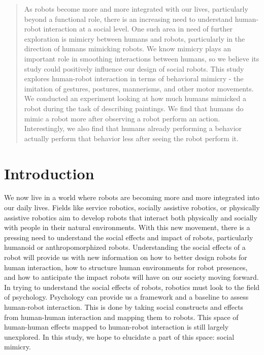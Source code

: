 \documentclass{acm_proc_article-sp}
\begin{document}
\maketitle
\begin{abstract}
As robots become more and more integrated with our lives, particularly beyond a functional role, there is an increasing need to understand human-robot interaction at a social level. One such area in need of further exploration is mimicry between humans and robots, particularly in the direction of humans mimicking robots. We know mimicry plays an important role in smoothing interactions between humans, so we believe its study could positively influence our design of social robots. This study explores human-robot interaction in terms of behavioral mimicry - the imitation of gestures, postures, mannerisms, and other motor movements. We conducted an experiment looking at how much humans mimicked a robot during the task of describing paintings. We find that humans do mimic a robot more after observing a robot perform an action. Interestingly, we also find that humans already performing a behavior actually perform that behavior less after seeing the robot perform it.
\end{abstract}


\section{Introduction}
We now live in a world where robots are becoming more and more integrated into our daily lives. Fields like service robotics, socially assistive robotics, or physically assistive robotics aim to develop robots that interact both physically and socially with people in their natural environments. With this new movement, there is a pressing need to understand the social effects and impact of robots, particularly humanoid or anthropomorphized robots. Understanding the social effects of a robot will provide us with new information on how to better design robots for human interaction, how to structure human environments for robot presences, and how to anticipate the impact robots will have on our society moving forward.
In trying to understand the social effects of robots, robotics must look to the field of psychology. Psychology can provide us a framework and a baseline to assess human-robot interaction. This is done by taking social constructs and effects from human-human interaction and mapping them to robots. This space of human-human effects mapped to human-robot interaction is still largely unexplored. In this study, we hope to elucidate a part of this space: social mimicry.
\end{document}
